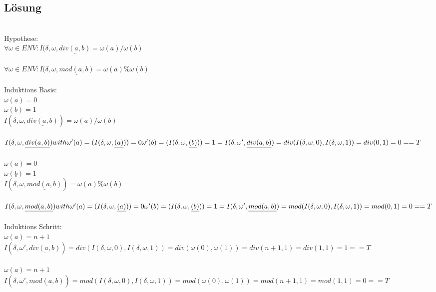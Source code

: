 \documentclass[12pt,runningheads,a4paper]{llncs}
\begin{document}
\subsection*{Lösung}
\\
Hypothese:\\
$\forall \omega \in ENV: I(\delta, \omega, \underline{div(a,b)} = \omega(a)/\omega(b) $
\\
\\
$\forall \omega \in ENV: I(\delta, \omega, \underline{mod(a,b)} = \omega(a) \%  \omega(b) $
\\
\\
Induktions Basis:\\
$\omega(\underline{a}) = 0$\\
$\omega(\underline{b}) = 1$\\
$I(\delta, \omega, \underline{div(a,b)}) = \omega(a)/\omega(b)$\\
\\
$I(\delta, \omega, \underline{div(a,b)}) with  \\ \omega'(a) = (I(\delta, \omega, \underline{(a)})) = 0  \\ 
\omega'(b) = (I(\delta, \omega, \underline{(b)})) = 1 \\
= I(\delta, \omega', \underline{div(a,b)}) = div(I(\delta, \omega, 0), I(\delta, \omega, 1)) = div(0,1) = 0 == T$
\\
\\
$\omega(\underline{a}) = 0$\\
$\omega(\underline{b}) = 1$\\
$I(\delta, \omega, \underline{mod(a,b)}) = \omega(a) \% \omega(b)$\\
\\
$I(\delta, \omega, \underline{mod(a,b)}) with  \\ \omega'(a) = (I(\delta, \omega, \underline{(a)})) = 0  \\ 
\omega'(b) = (I(\delta, \omega, \underline{(b)})) = 1 \\
= I(\delta, \omega', \underline{mod(a,b)}) = mod(I(\delta, \omega, 0), I(\delta, \omega, 1)) = mod(0,1) = 0 == T$
\\
\\
Induktions Schritt:\\
$\omega(a) = n+1$ \\
$ I(\delta, \omega', \underline{div(a,b)}) = div(I(\delta, \omega, 0), I(\delta, \omega, 1)) = div(\omega(0),\omega(1)) = div(n+1,1) = div(1,1) = 1 == T$
\\
\\
$\omega(a) = n+1$ \\
$ I(\delta, \omega', \underline{mod(a,b)}) = mod(I(\delta, \omega, 0), I(\delta, \omega, 1)) = mod(\omega(0),\omega(1)) = mod(n+1,1) = mod(1,1) = 0 == T$
\end{document}
